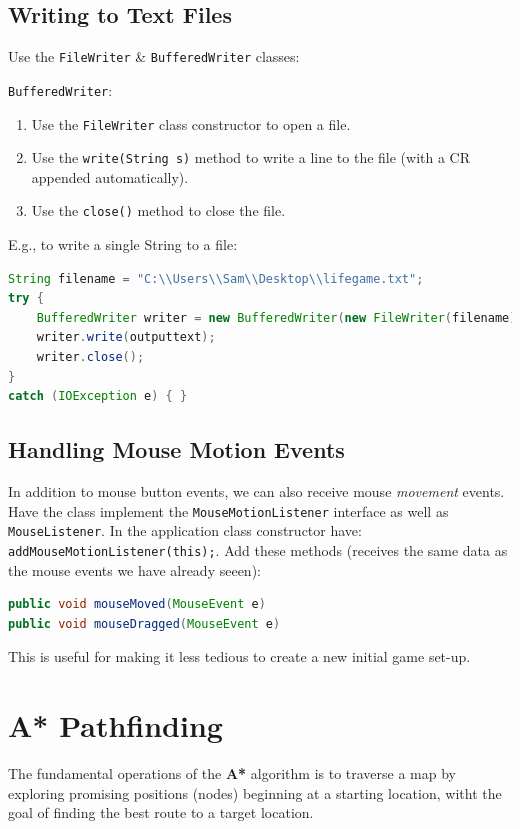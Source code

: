 \documentclass[11pt]{article}
\begin{document}
\subsection{Writing to Text Files}
Use the \verb|FileWriter| \& \verb|BufferedWriter| classes:

\verb|BufferedWriter|:
\begin{enumerate}
    \item   Use the \verb|FileWriter| class constructor to open a file. 
    \item   Use the \verb|write(String s)| method to write a line to the file (with a CR appended automatically).
    \item   Use the \verb|close()| method to close the file.
\end{enumerate}

E.g., to write a single String to a file:
\begin{lstlisting}[language=java]
String filename = "C:\\Users\\Sam\\Desktop\\lifegame.txt";
try {
    BufferedWriter writer = new BufferedWriter(new FileWriter(filename));
    writer.write(outputtext);
    writer.close();
} 
catch (IOException e) { }
\end{lstlisting}

\subsection{Handling Mouse Motion Events} 
In addition to mouse button events, we can also receive mouse \textit{movement} events. 
Have the class implement the \verb|MouseMotionListener| interface as well as \verb|MouseListener|. 
In the application class constructor have: \verb|addMouseMotionListener(this);|. 
Add these methods (receives the same data as the mouse events we have already seeen): 
\begin{lstlisting}[language=Java] 
public void mouseMoved(MouseEvent e)
public void mouseDragged(MouseEvent e)
\end{lstlisting}


This is useful for making it less tedious to create a new initial game set-up.

\section{A* Pathfinding}
The fundamental operations of the \textbf{A*} algorithm is to traverse a map by exploring promising positions (nodes) beginning at a starting location, witht the goal of finding the best route to a target location. 
\end{document}
